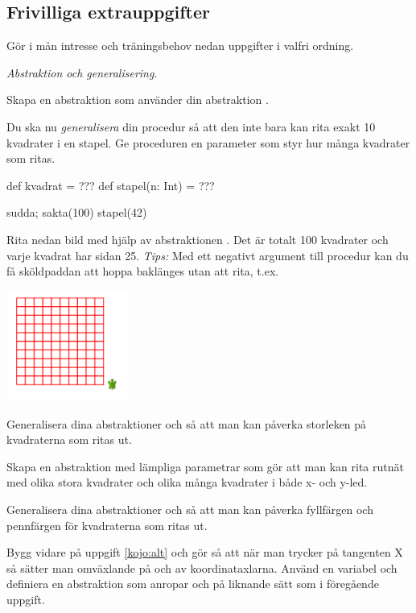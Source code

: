 \subsection{Frivilliga extrauppgifter}

\noindent Gör i mån intresse och träningsbehov nedan uppgifter i valfri ordning.

\Task \emph{Abstraktion och generalisering}.

\Subtask Skapa en abstraktion  som använder din abstraktion .

\Subtask Du ska nu \emph{generalisera} din procedur så att den inte bara kan rita exakt 10 kvadrater i en stapel. Ge proceduren  en parameter  som styr hur många kvadrater som ritas.
\begin{Code}
def kvadrat = ???
def stapel(n: Int) = ???

sudda; sakta(100)
stapel(42)
\end{Code}



\Subtask Rita nedan bild med hjälp av abstraktionen . Det är totalt 100 kvadrater och varje kvadrat har sidan 25. \emph{Tips:} Med ett negativt argument till procedur  kan du få sköldpaddan att hoppa baklänges utan att rita, t.ex. 

\includegraphics[width=0.3\textwidth]{../img/kojo/square-grid}

\Subtask Generalisera dina abstraktioner  och  så att man kan påverka storleken på kvadraterna som ritas ut.

\Subtask Skapa en abstraktion  med lämpliga parametrar som gör att man kan rita rutnät med olika stora kvadrater och olika många kvadrater i både x- och y-led.

\Subtask Generalisera dina abstraktioner  och  så att man kan påverka fyllfärgen och pennfärgen för kvadraterna som ritas ut.

\Task Bygg vidare på uppgift \ref{kojo:alt} och gör så att när man trycker på tangenten X så sätter man omväxlande på och av koordinataxlarna. Använd en variabel  och definiera en abstraktion  som anropar  och  på liknande sätt som i föregående uppgift.


